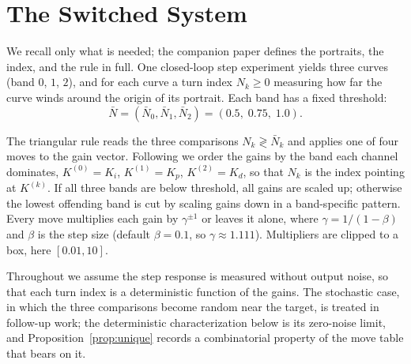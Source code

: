 \documentclass[letterpaper, 10pt, conference, twocolumn]{ieeeconf}
\newcommand{\Nbar}{\bar{N}}
\begin{document}
\section{The Switched System}
\label{sec:rule}

We recall only what is needed; the companion paper \cite{Paper1} defines the
portraits, the index, and the rule in full. One closed-loop step experiment
yields three curves (band $0$, $1$, $2$), and for each curve a turn index
$N_k \ge 0$ measuring how far the curve winds around the origin of its
portrait. Each band has a fixed threshold:
\begin{equation}
\Nbar = (\Nbar_0, \Nbar_1, \Nbar_2) = (0.5,\; 0.75,\; 1.0).
\label{eq:thresholds}
\end{equation}

The triangular rule reads the three comparisons $N_k \gtrless \Nbar_k$ and
applies one of four moves to the gain vector. Following \cite{Paper1} we
order the gains by the band each channel dominates,
$K^{(0)} = K_i$, $K^{(1)} = K_p$, $K^{(2)} = K_d$, so that $N_k$ is the index
pointing at $K^{(k)}$. If all
three bands are below threshold, all gains are scaled up; otherwise the lowest
offending band is cut by scaling gains down in a band-specific pattern. Every
move multiplies each gain by $\gamma^{\pm 1}$ or leaves it alone, where
$\gamma = 1/(1-\beta)$ and $\beta$ is the step size (default $\beta = 0.1$,
so $\gamma \approx 1.111$). Multipliers are clipped to a box, here
$[0.01, 10]$.

Throughout we assume the step response is measured without output noise, so
that each turn index is a deterministic function of the gains. The stochastic
case, in which the three comparisons become random near the target, is treated
in follow-up work; the deterministic characterization below is its zero-noise
limit, and Proposition~\ref{prop:unique} records a combinatorial property of
the move table that bears on it.
\end{document}
